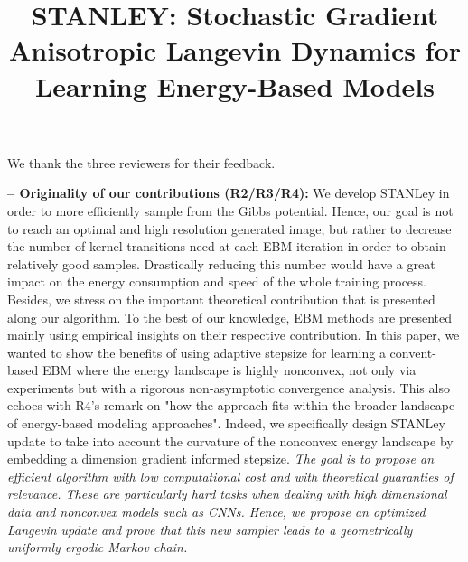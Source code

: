 \documentclass[10pt,twocolumn,letterpaper]{article}
\begin{document}
\title{STANLEY: Stochastic Gradient Anisotropic Langevin Dynamics for Learning Energy-Based Models}  %

\maketitle
\thispagestyle{empty}



We thank the three reviewers for their feedback. 

\noindent \textbf{-- Originality of our contributions (R2/R3/R4):}
We develop STANLey in order to more efficiently sample from the Gibbs potential. Hence, our goal is not to reach an optimal and high resolution generated image, but rather to decrease the number of kernel transitions need at each EBM iteration in order to obtain relatively good samples.
Drastically reducing this number would have a great impact on the energy consumption and speed of the whole training process.
Besides, we stress on the important theoretical contribution that is presented along our algorithm. 
To the best of our knowledge, EBM methods are presented mainly using empirical insights on their respective contribution.
In this paper, we wanted to show the benefits of using adaptive stepsize for learning a convent-based EBM where the energy landscape is highly nonconvex, not only via experiments but with a rigorous non-asymptotic convergence analysis.
This also echoes with R4's remark on "how the approach fits within the broader landscape of energy-based modeling approaches".
Indeed, we specifically design STANLey update to take into account the curvature of the nonconvex energy landscape by embedding a dimension gradient informed stepsize.
\textit{The goal is to propose an efficient algorithm with low computational cost and with theoretical guaranties of relevance.
These are particularly hard tasks when dealing with high dimensional data and nonconvex models such as CNNs.
Hence, we propose an optimized Langevin update and prove that this new sampler leads to a geometrically uniformly ergodic Markov chain.}
\end{document}
